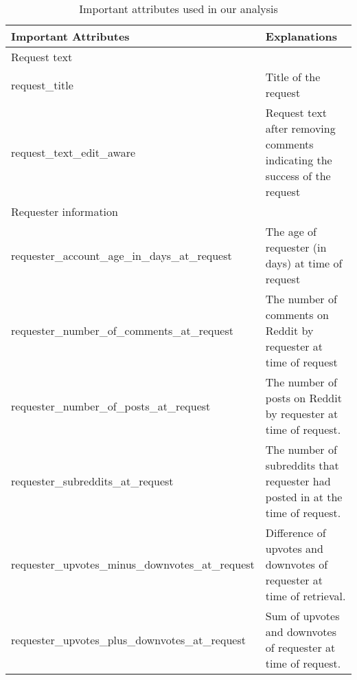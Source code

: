 \begin{table}[]
	\sf\scriptsize
	\centering
	\caption{Important attributes used in our analysis}
	\label{fields}
	\begin{tabular}{lp{10cm}}
		\toprule
		Important Attributes                              & Explanations                                                                          \\
		\midrule
		\multicolumn{2}{l}{Request text}                                                                                                        \\
		\midrule
		request\_title                                    & Title of the request                                                                  \\
		request\_text\_edit\_aware                        & Request text after removing comments indicating the success of the request            \\
		\midrule
		\multicolumn{2}{l}{Requester information}                                                                                                 \\
		\midrule
		requester\_account\_age\_in\_days\_at\_request    & The age of requester (in days) at time of request                                     \\
		requester\_number\_of\_comments\_at\_request      & The number of comments on Reddit by requester at time of request                      \\
		requester\_number\_of\_posts\_at\_request         & The number of posts on Reddit by requester at time of request.                        \\
		requester\_subreddits\_at\_request                & The number of subreddits that requester had posted in at the time of request. \\
		requester\_upvotes\_minus\_downvotes\_at\_request & Difference of upvotes and downvotes of requester at time of retrieval.                \\
		requester\_upvotes\_plus\_downvotes\_at\_request  & Sum of  upvotes and downvotes of requester at time of request.                        \\
		\bottomrule
	\end{tabular}
\end{table}